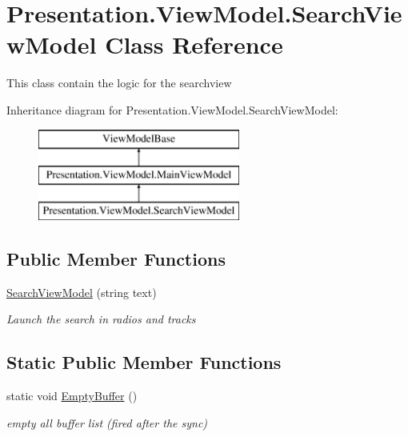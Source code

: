 \hypertarget{class_presentation_1_1_view_model_1_1_search_view_model}{}\section{Presentation.\+View\+Model.\+Search\+View\+Model Class Reference}
\label{class_presentation_1_1_view_model_1_1_search_view_model}


This class contain the logic for the searchview  


Inheritance diagram for Presentation.\+View\+Model.\+Search\+View\+Model\+:\begin{figure}[H]
\begin{center}
\leavevmode
\includegraphics[height=3.000000cm]{class_presentation_1_1_view_model_1_1_search_view_model}
\end{center}
\end{figure}
\subsection*{Public Member Functions}
\begin{DoxyCompactItemize}
\item 
\hyperlink{class_presentation_1_1_view_model_1_1_search_view_model_a325a16f61ed7bc7dedd583b5f5f5faec}{Search\+View\+Model} (string text)
\begin{DoxyCompactList}\small\item\em Launch the search in radios and tracks \end{DoxyCompactList}\end{DoxyCompactItemize}
\subsection*{Static Public Member Functions}
\begin{DoxyCompactItemize}
\item 
static void \hyperlink{class_presentation_1_1_view_model_1_1_search_view_model_aca916aa79980de7c81ac70a9f19ed0e3}{Empty\+Buffer} ()
\begin{DoxyCompactList}\small\item\em empty all buffer list (fired after the sync) \end{DoxyCompactList}\end{DoxyCompactItemize}
